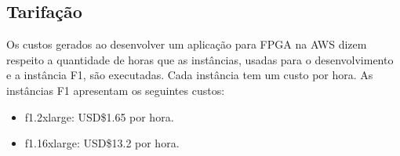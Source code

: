 \subsection{Tarifação} \label{sec:tarifacao}

Os custos gerados ao desenvolver um aplicação para FPGA na AWS dizem respeito a quantidade de horas que as instâncias, usadas para o desenvolvimento e a instância F1, são executadas. Cada instância tem um custo por hora. As instâncias F1 apresentam os seguintes custos:

\begin{itemize}
    \item f1.2xlarge: USD\$1.65 por hora.
    
    \item f1.16xlarge: USD\$13.2 por hora.
\end{itemize}


    



